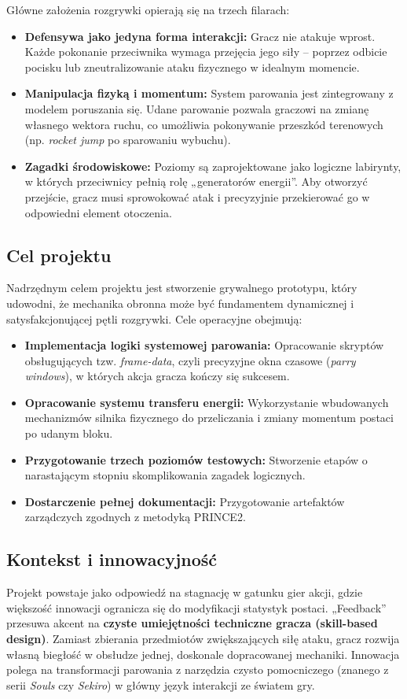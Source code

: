 \documentclass[11pt,a4paper]{article}
\begin{document}
Główne założenia rozgrywki opierają się na trzech filarach:
\begin{itemize}[noitemsep]
    \item \textbf{Defensywa jako jedyna forma interakcji:} Gracz nie atakuje wprost. Każde pokonanie przeciwnika wymaga przejęcia jego siły – poprzez odbicie pocisku lub zneutralizowanie ataku fizycznego w idealnym momencie.
    \item \textbf{Manipulacja fizyką i momentum:} System parowania jest zintegrowany z modelem poruszania się. Udane parowanie pozwala graczowi na zmianę własnego wektora ruchu, co umożliwia pokonywanie przeszkód terenowych (np. \textit{rocket jump} po sparowaniu wybuchu).
    \item \textbf{Zagadki środowiskowe:} Poziomy są zaprojektowane jako logiczne labirynty, w których przeciwnicy pełnią rolę „generatorów energii”. Aby otworzyć przejście, gracz musi sprowokować atak i precyzyjnie przekierować go w odpowiedni element otoczenia.
\end{itemize}

\subsection{Cel projektu}
Nadrzędnym celem projektu jest stworzenie grywalnego prototypu, który udowodni, że mechanika obronna może być fundamentem dynamicznej i satysfakcjonującej pętli rozgrywki. Cele operacyjne obejmują:
\begin{itemize}[noitemsep]
    \item \textbf{Implementacja logiki systemowej parowania:} Opracowanie skryptów obsługujących tzw. \textit{frame-data}, czyli precyzyjne okna czasowe (\textit{parry windows}), w których akcja gracza kończy się sukcesem.
    \item \textbf{Opracowanie systemu transferu energii:} Wykorzystanie wbudowanych mechanizmów silnika fizycznego do przeliczania i zmiany momentum postaci po udanym bloku.
    \item \textbf{Przygotowanie trzech poziomów testowych:} Stworzenie etapów o narastającym stopniu skomplikowania zagadek logicznych.
    \item \textbf{Dostarczenie pełnej dokumentacji:} Przygotowanie artefaktów zarządczych zgodnych z metodyką PRINCE2.
\end{itemize}

\subsection{Kontekst i innowacyjność}
Projekt powstaje jako odpowiedź na stagnację w gatunku gier akcji, gdzie większość innowacji ogranicza się do modyfikacji statystyk postaci. „Feedback” przesuwa akcent na \textbf{czyste umiejętności techniczne gracza (skill-based design)}. Zamiast zbierania przedmiotów zwiększających siłę ataku, gracz rozwija własną biegłość w obsłudze jednej, doskonale dopracowanej mechaniki. Innowacja polega na transformacji parowania z narzędzia czysto pomocniczego (znanego z serii \textit{Souls} czy \textit{Sekiro}) w główny język interakcji ze światem gry.
\end{document}

